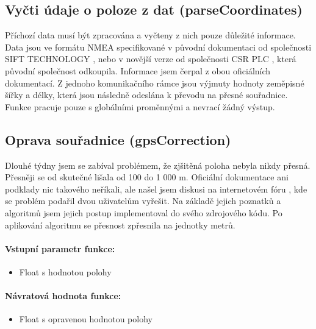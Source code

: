 \documentclass[FM,BP]{tulthesis}  %
\begin{document}
\subsection{Vyčti údaje o poloze z dat (parseCoordinates)}
Příchozí data musí být zpracována a vyčteny z nich pouze důležité informace. Data jsou ve formátu NMEA specifikované v původní dokumentaci od společnosti SIFT TECHNOLOGY \cite{SIFT}, nebo v novější verze od společnosti CSR PLC \cite{CSR}, která původní společnost odkoupila. Informace jsem čerpal z obou oficiálních dokumentací. Z jednoho komunikačního rámce jsou výjmuty hodnoty zeměpisné šířky a délky, která jsou následně odeslána k převodu na přesné souřadnice. Funkce pracuje pouze s globálními proměnnými a nevrací žádný výstup.

\subsection{Oprava souřadnice (gpsCorrection)}
Dlouhé týdny jsem se zabíval problémem, že zjšitěná poloha nebyla nikdy přesná. Přesněji se od skutečné lišala od 100 do 1 000 m. Oficiální dokumentace ani podklady nic takového neříkali, ale našel jsem diskusi na internetovém fóru \cite{correct}, kde se problém podařil dvou uživatelům vyřešit. Na základě jejich poznatků a algoritmů jsem jejich postup implementoval do svého zdrojového kódu. Po aplikování algoritmu se přesnost zpřesnila na jednotky metrů.

\paragraph{Vstupní parametr funkce:}
\begin{itemize}
\item Float s hodnotou polohy
\end{itemize}

\paragraph{Návratová hodnota funkce:}
\begin{itemize}
\item Float s opravenou hodnotou polohy
\end{itemize}
\end{document}
